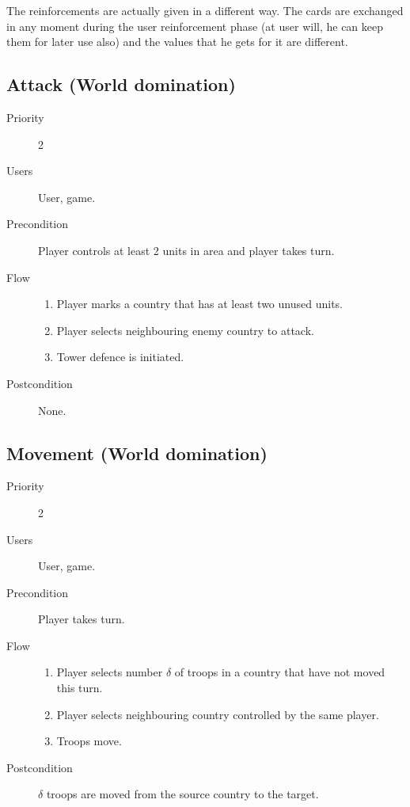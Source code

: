 \documentclass[12pt,a4paper]{article}
\begin{document}
\begin{todo}
  The reinforcements are actually given in a different way. The cards
  are exchanged in any moment during the user reinforcement phase (at
  user will, he can keep them for later use also) and the values that he
  gets for it are different.
\end{todo}

\subsection{Attack (World domination)}
\begin{description}
\item[Priority] 2
\item[Users] User, game.
\item[Precondition] Player controls at least 2 units in area and
  player takes turn.
\item[Flow]\mbox{}
  \begin{enumerate}
  \item Player marks a country that has at least two unused units.
  \item Player selects neighbouring enemy country to attack.
  \item Tower defence is initiated.
  \end{enumerate}
\item[Postcondition] None.
\end{description}

\subsection{Movement (World domination)}
\begin{description}
\item[Priority] 2
\item[Users] User, game.
\item[Precondition] Player takes turn.
\item[Flow]\mbox{}
  \begin{enumerate}
  \item Player selects number $\delta$ of troops in a country that have not moved
    this turn.
  \item Player selects neighbouring country controlled by the same
    player.
  \item Troops move.
  \end{enumerate}
\item[Postcondition] $\delta$ troops are moved from the source country
  to the target.
\end{description}
\end{document}
